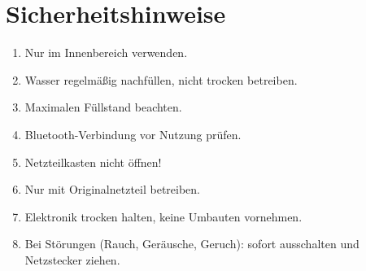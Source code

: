%
%
%


\section{Sicherheitshinweise}
\begin{enumerate}
 \item Nur im Innenbereich verwenden.
\item Wasser regelmäßig nachfüllen, nicht trocken betreiben.
\item Maximalen Füllstand beachten.
\item Bluetooth-Verbindung vor Nutzung prüfen.
\item Netzteilkasten nicht öffnen!
\item Nur mit Originalnetzteil betreiben.
\item Elektronik trocken halten, keine Umbauten vornehmen.
\item Bei Störungen (Rauch, Geräusche, Geruch): sofort ausschalten und Netzstecker ziehen.
\end{enumerate}


